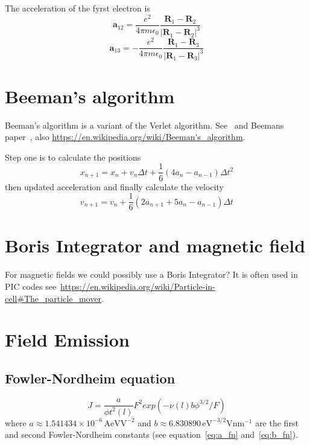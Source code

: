 \documentclass[a4paper,10pt]{article}
\numberwithin{equation}{section}
\begin{document}
  The acceleration of the fyrst electron is
  \begin{equation}
    \mathbf{a}_{12} = \frac{e^2}{4\pi m\epsilon_0} \frac{\mathbf{R}_1 - \mathbf{R}_2}{|\mathbf{R}_1 - \mathbf{R}_2|^3}
  \end{equation}
  \begin{equation}
    \mathbf{a}_{13} = -\frac{e^2}{4\pi m\epsilon_0} \frac{\mathbf{R}_1 - \mathbf{R}_3}{|\mathbf{R}_1 - \mathbf{R}_3|^3}
  \end{equation}
  
\section{Beeman's algorithm}
Beeman's algorithm is a variant of the Verlet algorithm.
See~\cite{LEVITT1983617} and Beemans paper~\cite{BEEMAN1976130}, also \url{https://en.wikipedia.org/wiki/Beeman's_algorithm}.

Step one is to calculate the positions
\begin{equation}
 x_{n+1} = x_n + v_n\Delta t + \frac{1}{6}\left( 4a_n - a_{n-1}\right)\Delta t^2
\end{equation}
then updated acceleration and finally calculate the velocity
\begin{equation}
 v_{n+1} = v_n + \frac{1}{6}\left( 2a_{n+1} + 5a_n - a_{n-1} \right)\Delta t
\end{equation}

\section{Boris Integrator and magnetic field}
For magnetic fields we could possibly use a Boris Integrator? It is often used in PIC codes see~\url{https://en.wikipedia.org/wiki/Particle-in-cell#The_particle_mover}.

\clearpage
\section{Field Emission}
\subsection{Fowler-Nordheim equation}
\begin{equation}
  J = \frac{a}{\phi t^2(l)}F^2 exp(-\nu(l)b\phi^{3/2}/F)
\end{equation}
where \(a \approx 1.541434\times 10^{-6}\,\mathrm{AeVV^{-2}}\) and \(b \approx 6.830890\,\mathrm{eV^{-3/2} V nm^{-1}}\) are
the first and second Fowler-Nordheim constants (see equation~\eqref{eq:a_fn} and~\eqref{eq:b_fn}).
\end{document}
